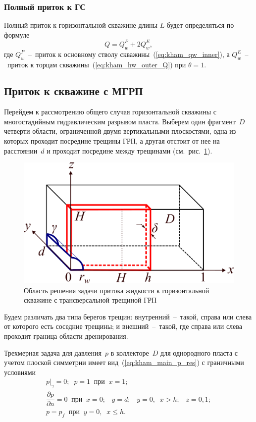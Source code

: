 \documentclass{article}
\begin{document}
\subsubsection{Полный приток к ГС}
Полный приток к горизонтальной скважине длины $L$ будет определяться по формуле
\begin{equation}
\displaystyle
Q = Q_w^P + 2 Q_w^E,
\label{eq:kham_hw_total}
\end{equation}
где $Q_w^P$~--~приток к основному стволу скважины~(\ref{eq:kham_qw_inner}), а $Q_w^E$~--~приток к торцам скважины~(\ref{eq:kham_hw_outer_Q}) при $\theta=1$.

\subsection{Приток к скважине с МГРП}
Перейдем к рассмотрению общего случая горизонтальной скважины с многостадийным гидравлическим разрывом пласта.
Выберем один фрагмент~$D$ четверти области, ограниченной двумя вертикальными плоскостями, одна из которых проходит посредине трещины ГРП, а другая отстоит от нее на расстоянии~$d$ и проходит посредине между трещинами (см.~рис.~\ref{fig:kham_inner_sector_scheme}).

\begin{figure}[!ht]
\centering
\includegraphics[width=0.7\linewidth]{images/schemes/kham_fract_inner_scheme.png}
\caption{\label{fig:kham_inner_sector_scheme}Область решения задачи притока жидкости к горизонтальной скважине с трансверсальной трещиной ГРП}
\end{figure}

Будем различать два типа берегов трещин: внутренний~--~такой, справа или слева от которого есть соседние трещины; и внешний~--~такой, где справа или слева проходит граница области дренирования.

Трехмерная задача для давления~$p$ в коллекторе~$D$ для однородного пласта с учетом плоской симметрии имеет вид~(\ref{eq:kham_main_p_res}) с граничными условиями
\begin{equation}
\displaystyle
\begin{gathered}
\left. p\right|_{\gamma} = 0; \;\; p=1 \;\; \text{при} \;\; x = 1; \\
\dfrac{\partial p}{\partial n} = 0 \;\; \text{при} \;\;x=0; \;\;\;
y = d; \;\;\; y = 0, \;\; x > h; \;\;\; z = 0,1; \\
p = p_f \;\; \text{при} \;\; y = 0, \;\; x \leq h.
\end{gathered}
\label{eq:kham_inner_section_main_boundaries}
\end{equation}
\end{document}
